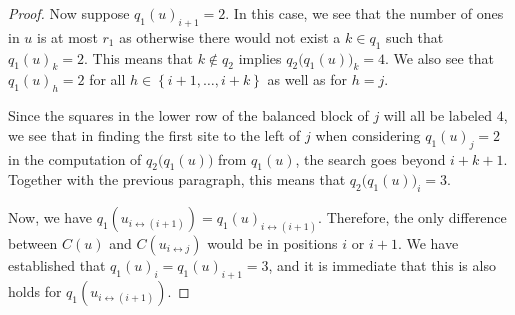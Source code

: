 \documentclass[reqno]{amsart}
\newcommand{\0}{\phantom{c}}
\newcommand{\set}[1]{\left\{ #1 \right\}}
\theoremstyle{plain}
\theoremstyle{definition}
\numberwithin{equation}{section}
\begin{document}
\begin{proof}
  Now suppose $q_1(u)_{i+1} = 2$.
  In this case, we see that the number of ones in $u$ is at most $r_1$ as otherwise there would not exist a $k \in q_1$ such that $q_1(u)_k = 2$.
  This means that $k \notin q_2$ implies $q_2\bigl( q_1(u) \bigr)_k = 4$.
  We also see that $q_1(u)_h = 2$ for all $h \in \set{i+1, \dotsc, i+k}$ as well as for $h = j$.

  Since the squares in the lower row of the balanced block of $j$ will all be labeled $4$, we see that in finding the first site to the left of $j$ when considering $q_1(u)_j = 2$ in the computation of $q_2\bigl( q_1(u) \bigr)$ from $q_1(u)$, the search goes beyond $i+k+1$.
  Together with the previous paragraph, this means that $q_2\bigl( q_1(u) \bigr)_i = 3$.

  Now, we have $q_1(u_{i\leftrightarrow (i+1)}) = q_1(u)_{i\leftrightarrow (i+1)}$.
  Therefore, the only difference between $C(u)$ and $C(u_{i\leftrightarrow j})$ would be in positions $i$ or $i+1$.
  We have established that $q_1(u)_i = q_1(u)_{i+1} = 3$, and it is immediate that this is also holds for $q_1(u_{i\leftrightarrow (i+1)})$.
\end{proof}
\end{document}
